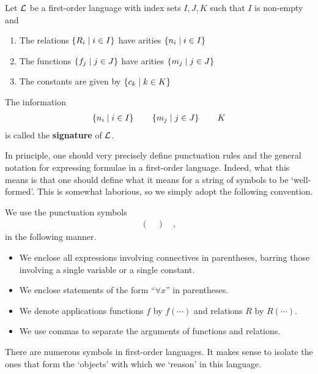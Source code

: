 \begin{boxdefinition}[Signature]
    Let $\mathcal{L}$ be a first-order language with index sets $I, J, K$ such that $I$ is non-empty and
    \begin{enumerate}
        \item The relations $\left\{ R_i \; \middle\vert \; i \in I \right\}$ have arities $\left\{ n_i \; \middle\vert \; i \in I \right\}$
        \item The functions $\left\{ f_j \; \middle\vert \; j \in J \right\}$ have arities $\left\{ m_j \; \middle\vert \; j \in J \right\}$
        \item The constants are given by $\left\{ c_k \; \middle\vert \; k \in K \right\}$
    \end{enumerate}
    The information
    \begin{align*}
        \left\{ n_i \; \middle\vert \; i \in I \right\}
        \qquad
        \left\{ m_j \; \middle\vert \; j \in J \right\}
        \qquad
        K
    \end{align*}
    is called the \textbf{signature} of $\mathcal{L}$.
\end{boxdefinition}

In principle, one should very precisely define punctuation rules and the general notation for expressing formulae in a first-order language. Indeed, what this means is that one should define what it means for a string of symbols to be `well-formed'. This is somewhat laborious, so we simply adopt the following convention.

\begin{boxconvention}
    We use the punctuation symbols
    \begin{align*}
        ( \quad ) \quad ,
    \end{align*}
    in the following manner.
    \begin{itemize}
        \item We enclose all expressions involving connectives in parentheses, barring those involving a single variable or a single constant.
        \item We enclose statements of the form ``$\forall x$'' in parentheses.
        \item We denote applications functions $f$ by $f(\cdots)$ and relations $R$ by $R(\cdots)$.
        \item We use commas to separate the arguments of functions and relations.
    \end{itemize}
\end{boxconvention}

There are numerous symbols in first-order languages. It makes sense to isolate the ones that form the `objects' with which we `reason' in this language.

